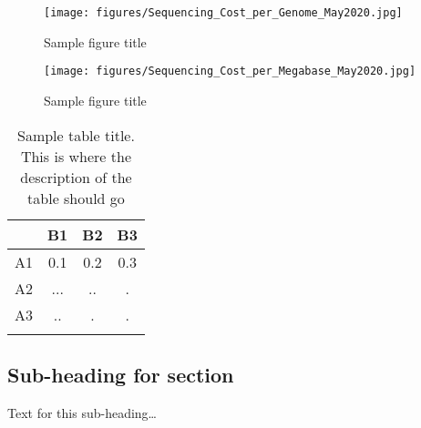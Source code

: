 \documentclass{bmcart}
\begin{document}
		\begin{figure}[h!]
			\texttt{[image: figures/Sequencing\_Cost\_per\_Genome\_May2020.jpg]}
			\caption{Sample figure title}
			\label{fig:cost_genome}
		\end{figure}
		
		\begin{figure}[h!]
			\texttt{[image: figures/Sequencing\_Cost\_per\_Megabase\_May2020.jpg]}
			\caption{Sample figure title}
			\label{fig:cost_megabase}
		\end{figure}
		
		
		\begin{table}[h!]
			\caption{Sample table title. This is where the description of the table should go}
			\begin{tabular}{cccc}
				\hline
				& B1  &B2   & B3\\ 
				\hline
				A1 & 0.1 & 0.2 & 0.3\\
				A2 & ... & ..  & .\\
				A3 & ..  & .   & .\\ 
				\hline
				\label{tab:ejemplo}
			\end{tabular}
		\end{table}
				
		\subsection*{Sub-heading for section}
			Text for this sub-heading\ldots
	
\end{document}
